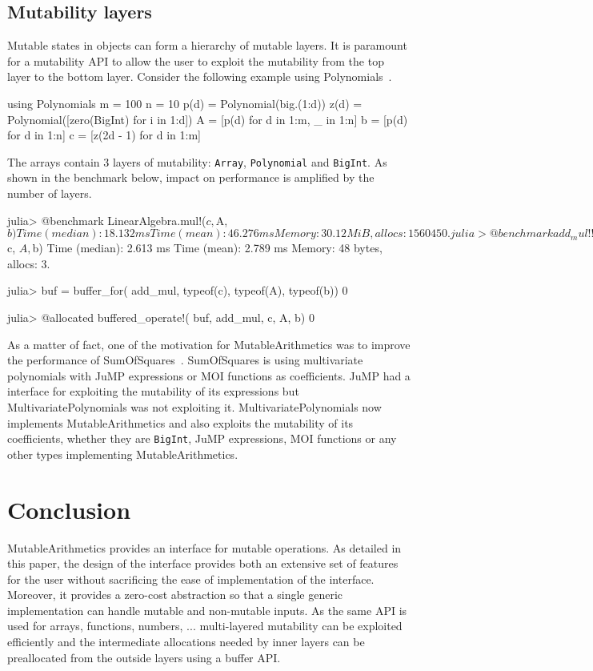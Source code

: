 \documentclass{juliacon}
\newcommand{\ma}{MutableArithmetics}
\begin{document}
\subsection{Mutability layers}
Mutable states in objects can form a hierarchy of mutable layers.
It is paramount for a mutability API to allow the user to exploit
the mutability from the top layer to the bottom layer.
Consider the following example using Polynomials~\cite{verzani2021polynomials}.
\begin{jllisting}
using Polynomials
m = 100
n = 10
p(d) = Polynomial(big.(1:d))
z(d) = Polynomial([zero(BigInt) for i in 1:d])
A = [p(d) for d in 1:m, _ in 1:n]
b = [p(d) for d in 1:n]
c = [z(2d - 1) for d in 1:m]
\end{jllisting}
The arrays contain 3 layers of mutability:
\lstinline|Array|, \lstinline|Polynomial| and \lstinline|BigInt|.
As shown in the benchmark below,
impact on performance is amplified by the number of layers.
\begin{jllisting}
julia> @benchmark LinearAlgebra.mul!($c, $A, $b)
 Time  (median):     18.132 ms
 Time  (mean):       46.276 ms
 Memory: 30.12 MiB, allocs: 1560450.

julia> @benchmark add_mul!!($c, $A, $b)
 Time  (median):     2.613 ms
 Time  (mean):       2.789 ms
 Memory: 48 bytes, allocs: 3.

julia> buf = buffer_for(
    add_mul, typeof(c), typeof(A), typeof(b))
0

julia> @allocated buffered_operate!(
           buf, add_mul, c, A, b)
0
\end{jllisting}

As a matter of fact, one of the motivation for \ma{}
was to improve the performance of SumOfSquares~\cite{legat2020sumofsquares}.
SumOfSquares is using multivariate polynomials with
JuMP expressions or MOI functions as coefficients.
JuMP had a interface for exploiting the mutability of its expressions
but MultivariatePolynomials was not exploiting it.
MultivariatePolynomials now implements \ma{}
and also exploits the mutability of its coefficients, whether they are \lstinline|BigInt|, JuMP expressions, MOI functions or any other types implementing \ma{}.

\section{Conclusion}
\ma{} provides an interface for mutable operations.
As detailed in this paper, the design of the interface provides
both an extensive set of features for the user without sacrificing
the ease of implementation of the interface.
Moreover, it provides a zero-cost abstraction so that a single generic
implementation can handle mutable and non-mutable inputs.
As the same API is used for arrays, functions, numbers, ... multi-layered mutability can be exploited efficiently
and the intermediate allocations needed by inner layers can be
preallocated from the outside layers using a buffer API.
\end{document}
